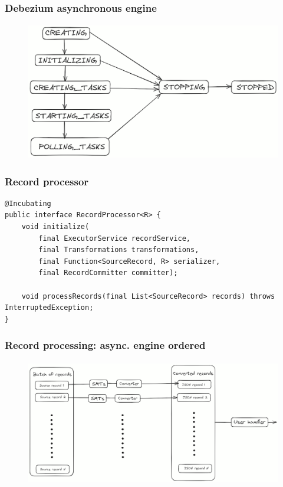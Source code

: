 \documentclass[10pt,utf8]{beamer}
\begin{document}
\begin{frame}
    \frametitle{Debezium asynchronous engine}
    \begin{figure}
        \centering
        \includegraphics[height=6cm]{./img/async_engine_states.eps}
    \end{figure}
\end{frame}

\begin{frame}[fragile]
    \frametitle{Record processor}
    \begin{lstlisting}[style=java]
@Incubating
public interface RecordProcessor<R> {
    void initialize(
        final ExecutorService recordService,
        final Transformations transformations,
        final Function<SourceRecord, R> serializer,
        final RecordCommitter committer);

    void processRecords(final List<SourceRecord> records) throws InterruptedException;
}
    \end{lstlisting}
\end{frame}

\begin{frame}
    \frametitle{Record processing:  async.  engine ordered}
    \begin{figure}
        \centering
        \includegraphics[height=5.5cm]{./img/parallel_processing_batch.eps}
    \end{figure}
\end{frame}
\end{document}
